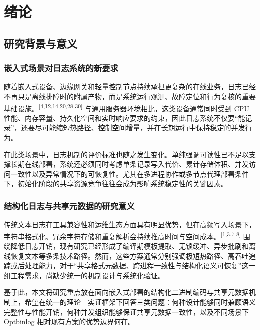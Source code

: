 \section{绪论}\label{ux7eeaux8bba}

\subsection{研究背景与意义}\label{ux7814ux7a76ux80ccux666fux4e0eux610fux4e49}

\subsubsection{嵌入式场景对日志系统的新要求}\label{ux5d4cux5165ux5f0fux573aux666fux5bf9ux65e5ux5fd7ux7cfbux7edfux7684ux65b0ux8981ux6c42}

随着嵌入式设备、边缘网关和轻量控制节点持续承担更复杂的在线业务，日志已经不再只是离线排障时的附属产物，而是系统运行观测、故障定位和行为复核的重要基础设施。\textsuperscript{[4,12,14,20,28-30]} 与通用服务器环境相比，这类设备通常同时受到 CPU 性能、内存容量、持久化空间和实时响应要求的约束，因此日志系统不仅要``能记录''，还要尽可能缩短热路径、控制空间增量，并在长期运行中保持稳定的并发行为。

在此类场景中，日志机制的评价标准也随之发生变化。单纯强调可读性已不足以支撑长期在线部署，系统还必须同时考虑单条记录写入代价、累计存储体积、并发访问一致性以及异常情况下的可恢复性。尤其在多进程协作或多节点代理部署条件下，初始化阶段的共享资源竞争往往会成为影响系统稳定性的关键因素。

\subsubsection{结构化日志与共享元数据的研究意义}\label{ux7ed3ux6784ux5316ux65e5ux5fd7ux4e0eux5171ux4eabux5143ux6570ux636eux7684ux7814ux7a76ux610fux4e49}

传统文本日志在工具兼容性和运维生态方面具有明显优势，但在高频写入场景下，字符串格式化、冗余字符存储和重复解析会持续推高时间与空间成本。\textsuperscript{[1,3,7-8]} 围绕降低日志开销，现有研究已经形成了编译期模板提取、无锁缓冲、异步批刷和离线恢复文本等多条技术路径。然而，这些方案通常分别强调极短热路径、高吞吐追踪或后处理能力，对于``共享格式元数据、跨进程一致性与结构化语义可恢复''这一组工程需求，尚缺少统一的机制设计与系统化验证。

基于此，本文将研究重点放在面向嵌入式部署的结构化二进制编码与共享元数据机制上，希望在统一的理论---实证框架下回答三类问题：何种设计能够同时兼顾语义完整性与性能开销，何种并发组织能够保证共享元数据一致性，以及不同场景下 Optbinlog 相对现有方案的优势边界何在。

